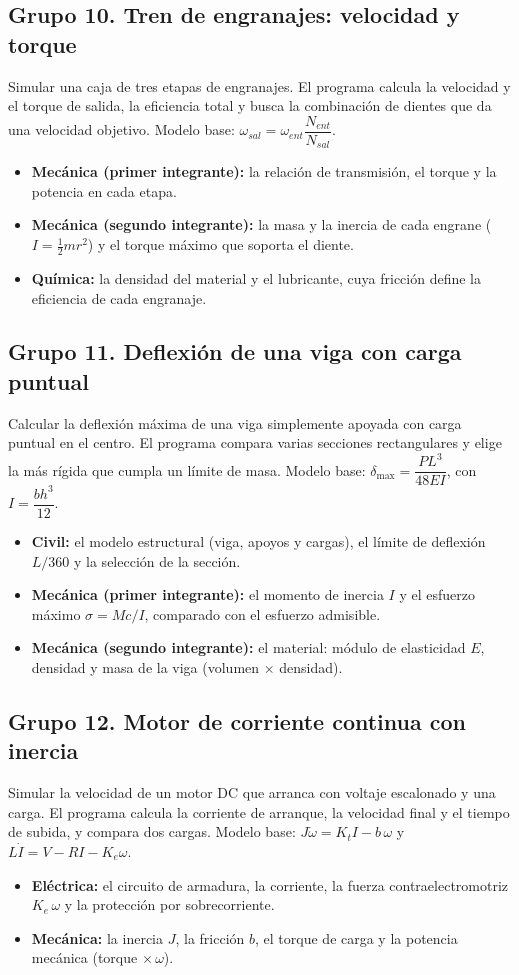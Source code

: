 \documentclass[doc]{apa6}
\begin{document}
\subsection*{Grupo 10. Tren de engranajes: velocidad y torque}
Simular una caja de tres etapas de engranajes. El programa calcula la velocidad y el torque de salida, la eficiencia total y busca la combinación de dientes que da una velocidad objetivo. Modelo base: $\omega_{sal}=\omega_{ent}\dfrac{N_{ent}}{N_{sal}}$.
\begin{itemize}
    \item \textbf{Mecánica (primer integrante):} la relación de transmisión, el torque y la potencia en cada etapa.
    \item \textbf{Mecánica (segundo integrante):} la masa y la inercia de cada engrane ($I=\tfrac{1}{2}mr^2$) y el torque máximo que soporta el diente.
    \item \textbf{Química:} la densidad del material y el lubricante, cuya fricción define la eficiencia de cada engranaje.
\end{itemize}

\subsection*{Grupo 11. Deflexión de una viga con carga puntual}
Calcular la deflexión máxima de una viga simplemente apoyada con carga puntual en el centro. El programa compara varias secciones rectangulares y elige la más rígida que cumpla un límite de masa. Modelo base: $\delta_{\max}=\dfrac{PL^3}{48EI}$, con $I=\dfrac{bh^3}{12}$.
\begin{itemize}
    \item \textbf{Civil:} el modelo estructural (viga, apoyos y cargas), el límite de deflexión $L/360$ y la selección de la sección.
    \item \textbf{Mecánica (primer integrante):} el momento de inercia $I$ y el esfuerzo máximo $\sigma=Mc/I$, comparado con el esfuerzo admisible.
    \item \textbf{Mecánica (segundo integrante):} el material: módulo de elasticidad $E$, densidad y masa de la viga (volumen $\times$ densidad).
\end{itemize}

\subsection*{Grupo 12. Motor de corriente continua con inercia}
Simular la velocidad de un motor DC que arranca con voltaje escalonado y una carga. El programa calcula la corriente de arranque, la velocidad final y el tiempo de subida, y compara dos cargas. Modelo base: $J\dot{\omega}=K_tI-b\,\omega$ y $L\dot{I}=V-RI-K_e\omega$.
\begin{itemize}
    \item \textbf{Eléctrica:} el circuito de armadura, la corriente, la fuerza contraelectromotriz $K_e\,\omega$ y la protección por sobrecorriente.
    \item \textbf{Mecánica:} la inercia $J$, la fricción $b$, el torque de carga y la potencia mecánica (torque $\times\,\omega$).
\end{itemize}
\newpage
\end{document}

